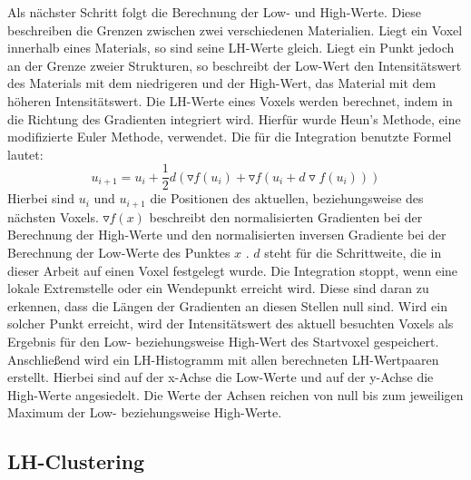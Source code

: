 Als nächster Schritt folgt die Berechnung der Low- und High-Werte. Diese beschreiben die Grenzen zwischen zwei verschiedenen Materialien. Liegt ein Voxel innerhalb eines Materials, so sind seine LH-Werte gleich. Liegt ein Punkt jedoch an der Grenze zweier Strukturen, so beschreibt der Low-Wert den Intensitätswert des Materials mit dem niedrigeren und der High-Wert, das Material mit dem höheren Intensitätswert. Die LH-Werte eines Voxels werden berechnet, indem in die Richtung des Gradienten integriert wird. Hierfür wurde Heun's Methode, eine modifizierte Euler Methode, verwendet. Die für die Integration benutzte Formel lautet:
\begin{equation}
	u_{i+1} = u_{i} + \frac{1}{2}d(\triangledown f (u_{i}) + \triangledown f(u_{i}+d \triangledown f(u_{i}))) 
\end{equation}
Hierbei sind $u_{i}$ und $u_{i+1}$ die Positionen des aktuellen, beziehungsweise des nächsten Voxels. $\triangledown f(x)$ beschreibt den normalisierten Gradienten bei der Berechnung der High-Werte und den normalisierten inversen Gradiente bei der Berechnung der Low-Werte des Punktes $x$ . $d$ steht für die Schrittweite, die in dieser Arbeit auf einen Voxel festgelegt wurde.
\newline
Die Integration stoppt, wenn eine lokale Extremstelle oder ein Wendepunkt erreicht wird. Diese sind daran zu erkennen, dass die Längen der Gradienten an diesen Stellen null sind. Wird ein solcher Punkt erreicht, wird der Intensitätswert des aktuell besuchten Voxels als Ergebnis für den Low- beziehungsweise High-Wert des Startvoxel gespeichert.
\newline
Anschließend wird ein LH-Histogramm mit allen berechneten LH-Wertpaaren erstellt. Hierbei sind auf der x-Achse die Low-Werte und auf der y-Achse die High-Werte angesiedelt. Die Werte der Achsen reichen von null bis zum jeweiligen Maximum der Low- beziehungsweise High-Werte.



\subsection{LH-Clustering}

